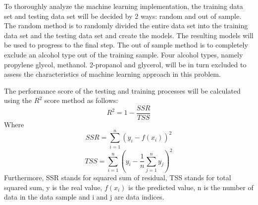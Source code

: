 To thoroughly analyze the machine learning implementation, the training 
data set and testing data set will be decided by 2 ways: 
random and out of sample.
The random method is to randomly divided the entire data set into the 
training data set and the testing data set and create the models. 
The resulting models will be used to progress to the final step.
The out of sample method is to completely exclude an alcohol type out of 
the training sample. Four alcohol types, namely propylene glycol, methanol. 
2-propanol and glycerol, will be in turn excluded to assess the 
characteristics of machine learning approach in this problem.

The performance score of the testing and training processes will be 
calculated using the $R^2$ score method as follows:
\begin{equation}
    R^{2}=1-\frac{S S R}{T S S}
\end{equation}
Where
\begin{equation}
    S S R=\sum_{i=1}^{n}\left(y_{i}-f\left(x_{i}\right)\right)^{2}
\end{equation}
\begin{equation}
    T S S=\sum_{i=1}^{n}\left(y_{i}-\frac{1}{n} \sum_{j=1}^{n} y_{j}\right)^{2}
\end{equation}
Furthermore, SSR stands for squared sum of residual, TSS stands for total squared sum, 
y is the real value, $f(x_i)$ is the predicted value, n is the number of data in 
the data sample and i and j are data indices.
